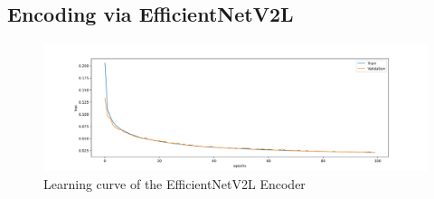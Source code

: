 \subsection{Encoding via EfficientNetV2L}

\begin{figure}[!ht]
    \centering
    \includegraphics[width=\textwidth,trim={0 1cm 0 1cm},clip]{./results/efficientnetv2l_vgg19/20230525_194238_results.png}
    \caption{Learning curve of the EfficientNetV2L Encoder}
    \label{fig:efficientnetv2l_learning_curve}
\end{figure}



